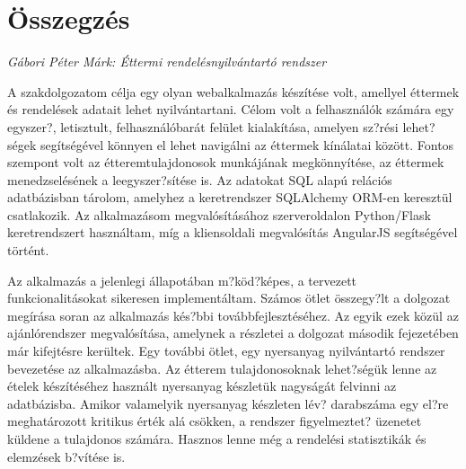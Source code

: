 \documentclass[a4paper,12pt]{article}
\begin{document}
\pagestyle{empty}

\section*{Összegzés}

\textit{Gábori Péter Márk: Éttermi rendelésnyilvántartó rendszer}

\bigskip

A szakdolgozatom célja egy olyan webalkalmazás készítése volt, amellyel éttermek és rendelések adatait lehet nyilvántartani. Célom volt a felhasználók számára egy egyszer?, letisztult, felhasználóbarát felület kialakítása, amelyen sz?rési lehet?ségek segítségével könnyen el lehet navigálni az éttermek kínálatai között. Fontos szempont volt az étteremtulajdonosok munkájának megkönnyítése, az éttermek menedzselésének a leegyszer?sítése is. Az adatokat SQL alapú relációs adatbázisban tárolom, amelyhez a keretrendszer SQLAlchemy ORM-en keresztül csatlakozik. Az alkalmazásom megvalósításához szerveroldalon Python/Flask keretrendszert használtam, míg a kliensoldali megvalósítás AngularJS segítségével történt.

Az alkalmazás a jelenlegi állapotában m?köd?képes, a tervezett funkcionalitásokat sikeresen implementáltam. Számos ötlet összegy?lt a dolgozat megírása soran az alkalmazás kés?bbi továbbfejlesztéséhez. Az egyik ezek közül az ajánlórendszer megvalósítása, amelynek a részletei a dolgozat második fejezetében már kifejtésre kerültek. Egy további ötlet, egy nyersanyag nyilvántartó rendszer bevezetése az alkalmazásba. Az étterem tulajdonosoknak lehet?ségük lenne az ételek készítéséhez használt nyersanyag készletük nagyságát felvinni az adatbázisba. Amikor valamelyik nyersanyag készleten lév? darabszáma egy el?re meghatározott kritikus érték alá csökken, a rendszer figyelmeztet? üzenetet küldene a tulajdonos számára. Hasznos lenne még a rendelési statisztikák és elemzések b?vítése is.
\end{document}
